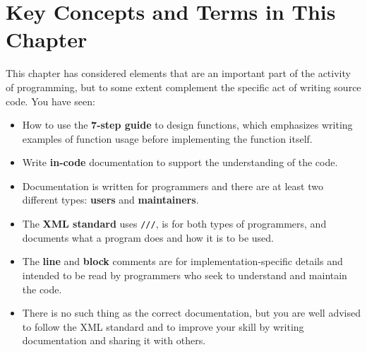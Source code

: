 \documentclass[fsharpNotes.tex]{subfiles}
\begin{document}
\section{Key Concepts and Terms in This Chapter}
This chapter has considered elements that are an important part of the activity of programming, but to some extent complement the specific act of writing source code. You have seen:
\begin{itemize}
\item How to use the \textbf{7-step guide} to design functions, which emphasizes writing examples of function usage before implementing the function itself.
\item Write \textbf{in-code} documentation to support the understanding of the code. 
\item Documentation is written for programmers and there are at least two different types: \textbf{users} and \textbf{maintainers}. 
\item The \textbf{XML standard} uses \lstinline{///}, is for both types of programmers, and documents what a program does and how it is to be used.
\item The \textbf{line} and \textbf{block} comments are for implementation-specific details and intended to be read by programmers who seek to understand and maintain the code. 
\item There is no such thing as the correct documentation, but you are well advised to follow the XML standard and to improve your skill by writing documentation and sharing it with others.
\end{itemize}
\end{document}
